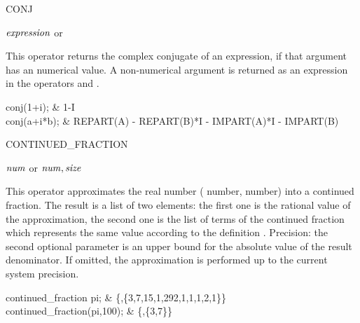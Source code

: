 \begin{Operator}[conj]{CONJ}

\begin{Syntax}
\(\meta{expression}\) or  
\end{Syntax}
This operator returns the complex conjugate of an expression, if that
argument has an numerical value.  A non-numerical argument is returned as
an expression in the operators  and .

\begin{Examples}
conj(1+i); & 1-I \\
conj(a+i*b); & REPART(A) - REPART(B)*I - IMPART(A)*I - IMPART(B)
\end{Examples}

\end{Operator}

\begin{Operator}{CONTINUED_FRACTION}

\begin{Syntax}
\(\meta{num}\) 
or \( \meta{num},\meta{size}\)
\end{Syntax}
This operator approximates the real number 
(  number,  number)
into a continued fraction. The result is a list of two elements: the
first one is the rational value of the approximation, the second one
is the list of terms of the continued fraction which represents the
same value according to the definition .
Precision: the second optional parameter  is an upper bound
for the absolute value of the result denominator. If omitted, the
approximation is performed up to the current system precision.


\begin{Examples}
continued_fraction pi;
 & \{,\{3,7,15,1,292,1,1,1,2,1\}\} \\
continued_fraction(pi,100);
 & \{,\{3,7\}\} \\
\end{Examples}

\end{Operator}

